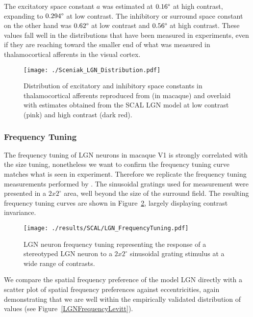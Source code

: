 The excitatory space constant $a$ was estimated at $0.16\degree$ at
high contrast, expanding to $0.294\degree$ at low contrast. The
inhibitory or surround space constant on the other hand was
$0.62\degree$ at low contrast and $0.56\degree$ at high contrast.
These values fall well in the distributions that have been measured in
experiments, even if they are reaching toward the smaller end of what
was measured in thalamocortical afferents in the visual cortex.

\begin{figure}
	\centering   \texttt{[image: ./Sceniak\_LGN\_Distribution.pdf]}
	\caption[Distribution of excitatory and inhibitory in
      thalamocortical afferents.]{Distribution of excitatory and
      inhibitory space constants in thalamocortical afferents
      reproduced from \cite{Sceniak2006} (in macaque) and overlaid
      with estimates obtained from the SCAL LGN model at low contrast
      (pink) and high contrast (dark red).}
	\label{LGNDistribution}
\end{figure}

\subsubsection{Frequency Tuning}

The frequency tuning of LGN neurons in macaque V1 is strongly
correlated with the size tuning, nonetheless we want to confirm the
frequency tuning curve matches what is seen in experiment. Therefore
we replicate the frequency tuning measurements performed by
\cite{Levitt2001}. The sinusoidal gratings used for measurement were
presented in a $2x2^{\circ}$ area, well beyond the size of the
surround field. The resulting frequency tuning curves are shown in
Figure~\ref{LGNFrequencyTuning}, largely displaying contrast
invariance.

\begin{figure}
	\centering
    \texttt{[image: ./results/SCAL/LGN\_FrequencyTuning.pdf]}
	\caption{LGN neuron frequency tuning representing the response of
      a stereotyped LGN neuron to a $2x2^{\circ}$ sinusoidal grating
      stimulus at a wide range of contrasts.}
	\label{LGNFrequencyTuning}
\end{figure}

We compare the spatial frequency preference of the model LGN directly
with a scatter plot of spatial frequency preferences against
eccentricities, again demonstrating that we are well within the
empirically validated distribution of values (see
Figure~\ref{LGNFrequencyLevitt}).

